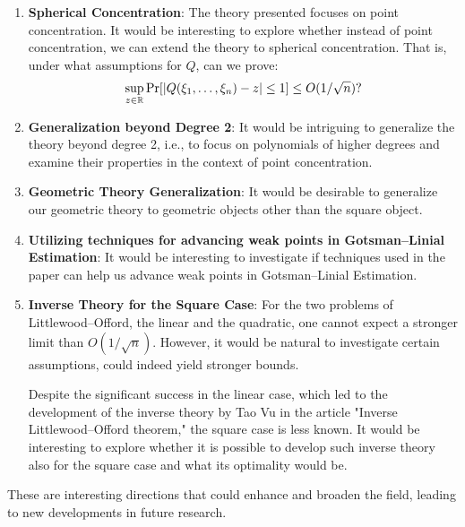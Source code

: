 \begin{enumerate}
	\item \textbf{Spherical Concentration}: The theory presented focuses on point concentration. It would be interesting to explore whether instead of point concentration, we can extend the theory to spherical concentration. That is, under what assumptions for $Q$, can we prove:
	\vspace{-0.3\baselineskip}
	\[ \sup_{z\in\mathbb{R}} \Pr[|Q(\xi_1,\ldots,\xi_n) - z| \leq 1] \leq O(1/\sqrt{n})? \vspace{-0.4\baselineskip} \]
	
	\item \textbf{Generalization beyond Degree 2}: It would be intriguing to generalize the theory beyond degree 2, i.e., to focus on polynomials of higher degrees and examine their properties in the context of point concentration.
	
	\item \textbf{Geometric Theory Generalization}: It would be desirable to generalize our geometric theory to geometric objects other than the square object.
	
	\item \textbf{Utilizing techniques for advancing weak points in Gotsman–Linial Estimation}: It would be interesting to investigate if techniques used in the paper can help us advance weak points in Gotsman–Linial Estimation.

	\item \textbf{Inverse Theory for the Square Case}: For the two problems of Littlewood–Offord, the linear and the quadratic, one cannot expect a stronger limit than $O(1/\sqrt{n})$. However, it would be natural to investigate certain assumptions, could indeed yield stronger bounds.
	
	Despite the significant success in the linear case, which led to the development of the inverse theory by Tao Vu in the article "Inverse Littlewood–Offord theorem," the square case is less known. It would be interesting to explore whether it is possible to develop such inverse theory also for the square case and what its optimality would be.
\end{enumerate}
 
These are interesting directions that could enhance and broaden the field, leading to new developments in future research.

